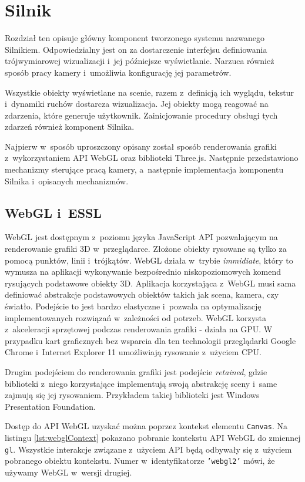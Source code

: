 \chapter{Silnik}

Rozdział ten opisuje główny komponent tworzonego systemu nazwanego Silnikiem. Odpowiedzialny jest on za dostarczenie interfejsu definiowania trójwymiarowej wizualizacji i~jej późniejsze wyświetlanie. Narzuca również sposób pracy kamery i~umożliwia konfigurację jej parametrów.

Wszystkie obiekty wyświetlane na scenie, razem z~definicją ich wyglądu, tekstur i~dynamiki ruchów dostarcza wizualizacja. Jej obiekty mogą reagować na zdarzenia, które generuje użytkownik. Zainicjowanie procedury obsługi tych zdarzeń również komponent Silnika.

Najpierw w~sposób uproszczony opisany został sposób renderowania grafiki z~wykorzystaniem API WebGL oraz biblioteki Three.js. Następnie przedstawiono mechanizmy sterujące pracą kamery, a~następnie implementacja komponentu Silnika i~opisanych mechanizmów.

\section{WebGL i~ESSL}

WebGL jest dostępnym z~poziomu języka JavaScript API pozwalającym na renderowanie grafiki 3D w~przeglądarce. Złożone obiekty rysowane są tylko za pomocą punktów, linii i~trójkątów.  WebGL działa w~trybie \textit{immidiate}, który to wymusza na aplikacji wykonywanie bezpośrednio niskopoziomowych komend rysujących podstawowe obiekty 3D. Aplikacja korzystająca z~WebGL musi sama definiować abstrakcje podstawowych obiektów takich jak scena, kamera, czy światło. Podejście to jest bardzo elastyczne i~pozwala na optymalizację implementowanych rozwiązań w~zależności od potrzeb\cite[Rozdział 1]{RealTime3DGraphics}. WebGL korzysta z~akceleracji sprzętowej podczas renderowania grafiki - działa na GPU. W przypadku kart graficznych bez wsparcia dla ten technologii przeglądarki Google Chrome i~Internet Explorer 11 umożliwiają rysowanie z~użyciem CPU.

Drugim podejściem do renderowania grafiki jest podejście \textit{retained}, gdzie biblioteki z~niego korzystające implementują swoją abstrakcję sceny i~same zajmują się jej rysowaniem. Przykładem takiej biblioteki jest Windows Presentation Foundation\cite{WPF}.

Dostęp do API WebGL uzyskać można poprzez kontekst elementu \texttt{Canvas}. Na listingu \ref{lst:webglContext} pokazano pobranie kontekstu API WebGL do zmiennej \texttt{gl}. Wszystkie interakcje związane z~użyciem API będą odbywały się z~użyciem pobranego obiektu kontekstu. Numer w~identyfikatorze \texttt{’webgl2’} mówi, że używamy WebGL w~wersji drugiej.

